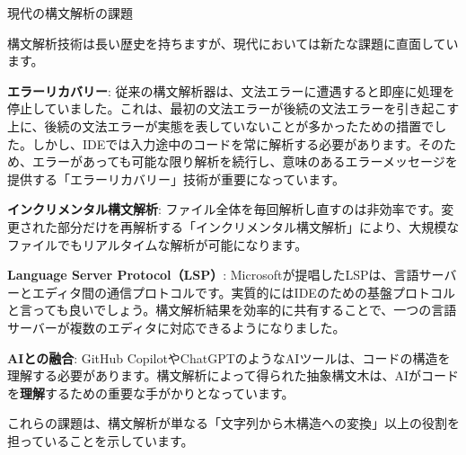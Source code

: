 \begin{kokocolumn}{現代の構文解析の課題}

構文解析技術は長い歴史を持ちますが、現代においては新たな課題に直面しています。

\textbf{エラーリカバリー}:
従来の構文解析器は、文法エラーに遭遇すると即座に処理を停止していました。これは、最初の文法エラーが後続の文法エラーを引き起こす上に、後続の文法エラーが実態を表していないことが多かったための措置でした。しかし、IDEでは入力途中のコードを常に解析する必要があります。そのため、エラーがあっても可能な限り解析を続行し、意味のあるエラーメッセージを提供する「エラーリカバリー」技術が重要になっています。

\textbf{インクリメンタル構文解析}:
ファイル全体を毎回解析し直すのは非効率です。変更された部分だけを再解析する「インクリメンタル構文解析」により、大規模なファイルでもリアルタイムな解析が可能になります。

\textbf{Language Server Protocol（LSP）}:
Microsoftが提唱したLSPは、言語サーバーとエディタ間の通信プロトコルです。実質的にはIDEのための基盤プロトコルと言っても良いでしょう。構文解析結果を効率的に共有することで、一つの言語サーバーが複数のエディタに対応できるようになりました。

\textbf{AIとの融合}: GitHub
CopilotやChatGPTのようなAIツールは、コードの構造を理解する必要があります。構文解析によって得られた抽象構文木は、AIがコードを\textbf{理解}するための重要な手がかりとなっています。

これらの課題は、構文解析が単なる「文字列から木構造への変換」以上の役割を担っていることを示しています。

\end{kokocolumn}
